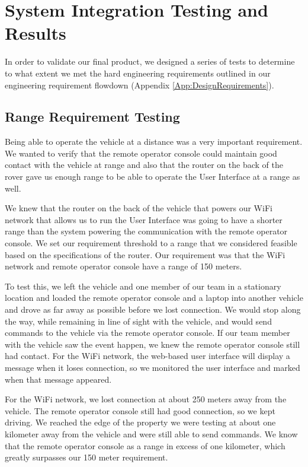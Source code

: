\chapter{System Integration Testing and Results}

In order to validate our final product, we designed a series of tests to determine to what extent we met the hard engineering requirements outlined in our engineering requirement flowdown (Appendix \ref{App:DesignRequirements}). 

\section{Range Requirement Testing}
Being able to operate the vehicle at a distance was a very important requirement.  We wanted to verify that the remote operator console could maintain good contact with the vehicle at range and also that the router on the back of the rover gave us enough range to be able to operate the User Interface at a range as well.

We knew that the router on the back of the vehicle that powers our WiFi network that allows us to run the User Interface was going to have a shorter range than the system powering the communication with the remote operator console.  We set our requirement threshold to a range that we considered feasible based on the specifications of the router.  Our requirement was that the WiFi network and remote operator console have a range of 150 meters.

To test this, we left the vehicle and one member of our team in a stationary location and loaded the remote operator console and a laptop into another vehicle and drove as far away as possible before we lost connection.  We would stop along the way, while remaining in line of sight with the vehicle, and would send commands to the vehicle via the remote operator console.  If our team member with the vehicle saw the event happen, we knew the remote operator console still had contact.  For the WiFi network, the web-based user interface will display a message when it loses connection, so we monitored the user interface and marked when that message appeared.  

For the WiFi network, we lost connection at about 250 meters away from the vehicle.  The remote operator console still had good connection, so we kept driving.  We reached the edge of the property we were testing at about one kilometer away from the vehicle and were still able to send commands.  We know that the remote operator console as a range in excess of one kilometer, which greatly surpasses our 150 meter requirement.

